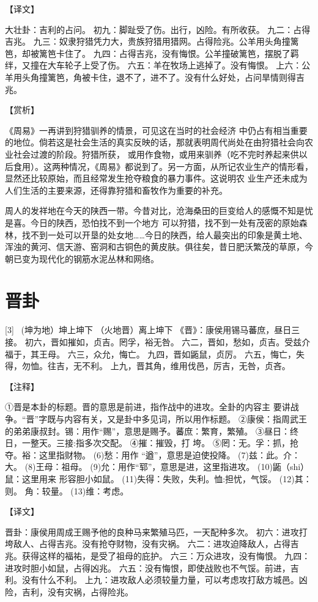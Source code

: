 \documentclass[12pt,UTF8]{ctexbook}
\begin{document}
【译文】

大壮卦：吉利的占问。
初九：脚趾受了伤。出行，凶险。有所收获。
九二：占得吉兆。
九三：奴隶狩猎凭力大，贵族狩猎用猎网。占得险兆。公羊用头角撞篱笆，却被篱笆卡住了。
九四：占得吉兆，没有悔恨。公羊撞破篱笆，摆脱了羁绊，又撞在大车轮子上受了伤。
六五：羊在牧场上逃掉了。没有悔恨。
上六：公羊用头角撞篱笆，角被卡住，退不了，进不了。没有什么好处，占问旱情则得吉兆。

【赏析】

《周易》一再讲到狩猎驯养的情景，可见这在当时的社会经济 中仍占有相当重要的地位。倘若这是社会生活的真实反映的话，那就表明周代尚处在由狩猎社会向农业社会过渡的阶段。狩猎所获， 或用作食物，或用来驯养（吃不完时养起来供以后食用）。这两种情况，《周易》都说到了。另一方面，从所记农业生产的情形看，显然还比较原始，而且经常发生抢夺粮食的暴力事件。这说明农 业生产还未成为人们生活的主要来源，还得靠狩猎和畜牧作为重要的补充。

周人的发祥地在今天的陕西一带。今昔对比，沧海桑田的巨变给人的感慨不知是忧是喜。今日的陕西，恐怕找不到一个地方 可以狩猎，找不到一处有茂密的原始森林，找不到一处可以开垦的处女地……今日的陕西，给人最突出的印象是黄土地、浑浊的黄河、信天游、窑洞和古铜色的黄皮肤。俱往矣，昔日肥沃繁茂的草原，今朝已变为现代化的钢筋水泥丛林和网络。

\chapter{晋卦}
[3] \ (坤为地）坤上坤下
（火地晋）离上坤下
《晋》：康侯用锡马蕃庶，昼日三接。
初六，晋如摧如，贞吉。罔孚，裕无咎。
六二，晋如，愁如，贞吉。受兹介福于，其王母。
六三，众允，悔亡。
九四，晋如鼫鼠，贞厉。
六五，悔亡，失得，勿恤。往吉，无不利。
上九，晋其角，维用伐邑，厉吉，无咎，贞吝。

【注释】

①晋是本卦的标题。晋的意思是前进，指作战中的进攻。全卦的内容主 要讲战争。“晋”字既与内容有关，又是卦中多见词，所以用作标题。
②康侯：指周武王的弟弟康叔封。锡：用作“赐”，意思是赐予。蕃庶：繁育，繁殖。
③昼日：终日，一整天。三接:指多次交配。
④摧：摧毁，打 垮。
⑤罔：无。孚：抓，抢夺。裕：这里指财物。
(6)愁：用作 “遒”，意思是迫使投降。
(7)兹：此。介：大。
(8)王母：祖母。
(9)允：用作“郓”，意思是进，这里指进攻。
(10)鼫（shi）鼠：这里用来 形容胆小如鼠。
(11)失得：失败，失利。恤:担忧，气馁。
(12)其：则。 角：较量。
(13)维：考虑。

【译文】

晋卦：康侯用周成王赐予他的良种马来繁殖马匹，一天配种多次。
初六：进攻打垮敌人、占得吉兆。没有抢夺财物，没有灾祸。
六二：进攻迫降敌人，占得吉兆。获得这样的福祐，是受了祖母的庇护。
六三：万众进攻，没有悔恨。
九四：进攻时胆小如鼠，占得凶兆。
六五：没有悔恨，即使战败也不气馁。前进，吉利。没有什么不利。
上九：进攻敌人必须较量力量，可以考虑攻打敌方城邑。凶险，吉利，没有灾祸，占得险兆。
\end{document}
